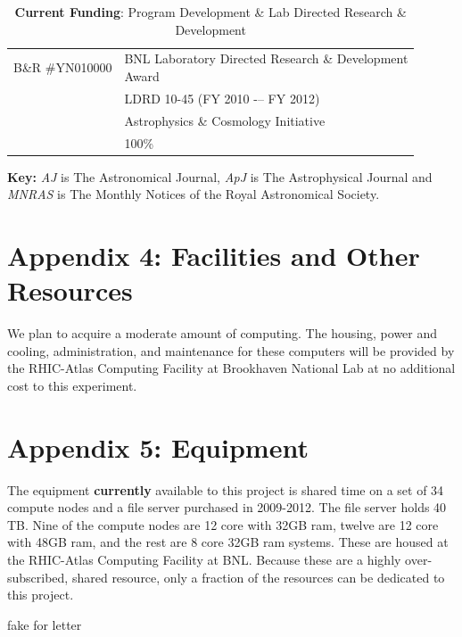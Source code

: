 \documentclass[12pt]{article}
\begin{document}
\begin{table}[h]
\begin{center}
\begin{tabular*}{0.85\textwidth}{ll}
B\&R \#YN010000  & \parbox[t]{\textwidth}{BNL Laboratory Directed 
   Research \& Development \\ Award} \\
                 & LDRD 10-45 (FY 2010 -– FY 2012) \\
                 & Astrophysics \& Cosmology Initiative \\
                 & 100\%
\end{tabular*}
\parbox{0.85\textwidth}{\caption{{\bf Current Funding}: Program Development 
\& Lab Directed Research \& Development \label{table:support}}}
\end{center}
\end{table}



\newpage
{}
\renewcommand{\refname}{\section*{Appendix 3: Bibliography for Narrative}\label{app:bib}}


\vspace{5mm}
\noindent
{\bf Key:} {\it AJ} is The Astronomical Journal, {\it ApJ} is The 
Astrophysical Journal and {\it MNRAS} is The Monthly Notices of the Royal
Astronomical Society.






\newpage
{}
\section*{Appendix 4: Facilities and Other Resources}

We plan to acquire a moderate amount of computing.  The housing, power and
cooling, administration, and maintenance for these computers will be provided
by the RHIC-Atlas Computing Facility at Brookhaven National Lab at no
additional cost to this experiment.		

\newpage
{}
\section*{Appendix 5: Equipment}

The equipment {\bf currently} available to this project is shared time on a set
of 34 compute nodes and a file server purchased in 2009-2012.  The file server
holds 40 TB. Nine of the compute nodes are 12 core with 32GB ram, twelve are 12
core with 48GB ram, and the rest are 8 core 32GB ram systems.  These are housed
at the RHIC-Atlas Computing Facility at BNL.  Because these are a highly
over-subscribed, shared resource, only a fraction of the resources can be
dedicated to this project.

\newpage
{}
fake for letter
\end{document}
